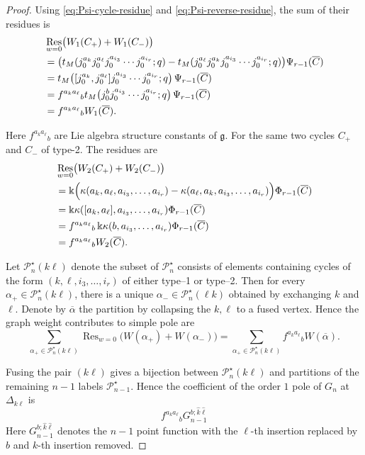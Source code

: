 \documentclass[11pt,a4paper]{amsart}
\numberwithin{equation}{section}
\theoremstyle{definition}
\theoremstyle{remark}
\DeclareMathOperator*{\Res}{Res}
\newcommand{\g}{\mathfrak g}
\newcommand{\kk}{\Bbbk}
\newcommand{\cP}{\mathcal P}
\begin{document}
\begin{proof}
Using \eqref{eq:Psi-cycle-residue} and
\eqref{eq:Psi-reverse-residue}, the sum of their residues is
\begin{align*}
&\Res_{w=0}\bigl(W_1(C_+)+W_1(C_-)\bigr)\notag\\
&=\bigl(
 t_M(j_0^{a_k}j_0^{a_\ell}j_0^{a_{i_3}}\cdots j_0^{a_{i_r}};q)
 -t_M(j_0^{a_\ell}j_0^{a_k}j_0^{a_{i_3}}\cdots j_0^{a_{i_r}};q)
\bigr)\Psi_{r-1}(\overline C)\notag\\
&=t_M\!\left(
[j_0^{a_k},j_0^{a_\ell}]
j_0^{a_{i_3}}\cdots j_0^{a_{i_r}};q
\right)\Psi_{r-1}(\overline C)\notag\\
&=f^{a_ka_\ell}{}_{b}
t_M\!\left(
j_0^bj_0^{a_{i_3}}\cdots j_0^{a_{i_r}};q
\right)\Psi_{r-1}(\overline C)\notag\\
&=f^{a_ka_\ell}{}_{b}W_1(\overline C).
\end{align*}

Here $f^{a_ka_\ell}{}_{b}$ are Lie algebra structure constants of $\g$. For the same two cycles $C_+$ and $C_-$ of type-2. The residues are
\begin{align*}
&\Res_{w=0}\bigl(W_2(C_+)+W_2(C_-)\bigr)\notag\\
&=\kk\Bigl(
 \kappa(a_k,a_\ell,a_{i_3},\ldots,a_{i_r})
 -\kappa(a_\ell,a_k,a_{i_3},\ldots,a_{i_r})
 \Bigr)\Phi_{r-1}(\overline C)\notag\\
&=\kk\kappa([a_k,a_\ell],a_{i_3},\ldots,a_{i_r})
  \Phi_{r-1}(\overline C)\notag\\
&=f^{a_ka_\ell}{}_{b}\,
  \kk\kappa(b,a_{i_3},\ldots,a_{i_r})
  \Phi_{r-1}(\overline C)\notag\\
&=f^{a_ka_\ell}{}_{b}W_2(\overline C).
\end{align*}

Let $\cP_n^\star(k\ell)$ denote the subset of $\cP_n^\star$ consists of elements containing cycles of the form $(k,\ell,i_3,\ldots,i_r)$ of either type--1 or type--2. Then for every $\alpha_+\in\cP_n^\star(k\ell)$, there is a unique $\alpha_-\in\cP_n^\star(\ell k)$ obtained by exchanging $k$ and $\ell$. Denote by $\overline \alpha$ the partition by collapsing the $k,\ell$ to a fused vertex. Hence the graph weight contributes to simple pole are
\[
\sum_{\alpha_+\in\cP_n^\star(k\ell)} \Res_{w=0}\bigl(W(\alpha_+)+W(\alpha_-)\bigr)=\sum_{\alpha_+\in\cP_n^\star(k\ell)}f^{a_ka_\ell}{}_{b}W(\overline \alpha).
\]

Fusing the pair $(k\ell)$ gives a bijection between $\cP_n^\star(k\ell)$ and partitions of the remaining $n-1$ labels $\cP_{n-1}^\star$. Hence the coefficient of the order $1$ pole of $G_n$ at $\Delta_{k\ell}$ is 
\[
f^{a_ka_\ell}{}_{b}
  G_{n-1}^{b;\widehat k\widehat\ell}
\]
Here $G_{n-1}^{b;\widehat k\widehat\ell}$ denotes the $n-1$ point function with the $\ell$-th insertion replaced by $b$ and $k$-th insertion removed.


\end{proof}
\end{document}
